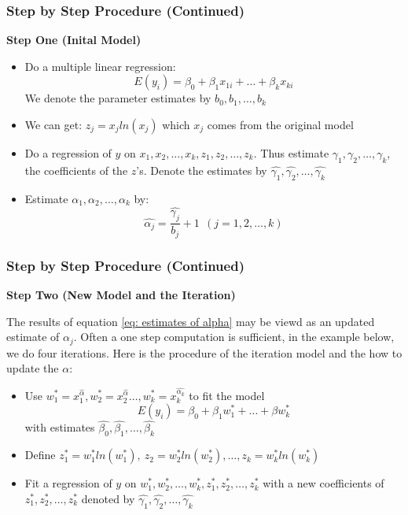 \documentclass[10pt,aspectratio=32]{beamer}
\begin{document}
\begin{frame}
	\frametitle{Step by Step Procedure (Continued)}
\textbf{Step One (Inital Model)}
\begin{itemize}
	\item Do a multiple linear regression: $$E(y_i) = \beta_0 + \beta_1 x_{1i} + \dots + \beta_k x_{ki}$$
	We denote the parameter estimates by $b_0, b_1, \dots, b_k$
	\item We can get: $z_j = x_j ln(x_j)$ which $x_j$ comes from the original model
	\item Do a regression of $y$ on $x_1, x_2, \dots, x_k, z_1, z_2, \dots, z_k$. Thus estimate $\gamma_1, \gamma_2, \dots, \gamma_k$, the coefficients of the $z$'s. Denote the estimates by $\hat{\gamma_1}, \hat{\gamma_2}, \dots, \hat{\gamma_k}$
	\item Estimate $\alpha_1, \alpha_2, \dots, \alpha_k$ by:
	$$\hat{\alpha_j} = \frac{\hat{\gamma_j}}{b_j} + 1 \ \ (j = 1, 2, \dots, k)\label{eq: estimates of alpha}$$
\end{itemize}
\end{frame}

\begin{frame}
 	\frametitle{Step by Step Procedure (Continued)}
 \textbf{Step Two (New Model and the Iteration)}

The results of equation \ref{eq: estimates of alpha} may be viewd as an updated estimate of $\alpha_j$. Often a one step computation is sufficient, in the example below, we do four iterations. Here is the procedure of the iteration model and the how to update the $\alpha$:

\begin{itemize}
	\item Use $w_1^* = x_1^{\hat{\alpha}}, w_2^* = x_2^{\hat{\alpha}} \dots, w_k^* = x_k^{\hat{\alpha_k}}$ to fit the model $$E(y_i) = \beta_0 + \beta_1 w_1^* + \dots + \beta w_k^*$$ with estimates $\hat{\beta_0}, \hat{\beta_1}, \dots, \hat{\beta_k}$
	\item Define $z_1^* = w_1^* ln(w_1^*), \ z_2 = w_2^* ln(w_2^*), \dots  ,z_k =w_k^* ln(w_k^*)$
	\item Fit a regression of $y$ on $w_1^*, w_2^*, \dots, w_k^*, z_1^*, z_2^*, \dots, z_k^*$ with a new coefficients of $z_1^*, z_2^*, \dots, z_k^*$ denoted by $\hat{\gamma_1}, \hat{\gamma_2}, \dots, \hat{\gamma_k}$
\end{itemize}

\end{frame}
\end{document}
